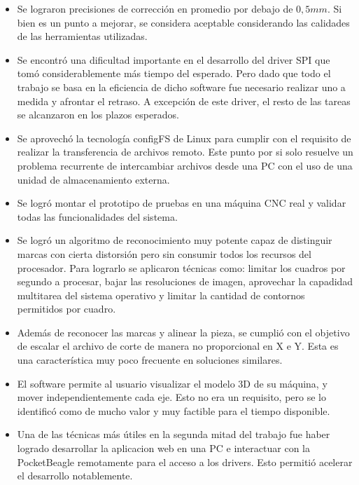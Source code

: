 \begin{itemize}
   \item{Se lograron precisiones de corrección en promedio por debajo de $0,5mm$. Si bien es un punto a mejorar, se considera aceptable considerando las calidades de las herramientas utilizadas.}

   \item{Se encontró una dificultad importante en el desarrollo del driver SPI que tomó considerablemente más tiempo del esperado. Pero dado que todo el trabajo se basa en la eficiencia de dicho software fue necesario realizar uno a medida y afrontar el retraso. A excepción de este driver, el resto de las tareas se alcanzaron en los plazos esperados.}
   
   \item{Se aprovechó la tecnología configFS de Linux para cumplir con el requisito de realizar la transferencia de archivos remoto. Este punto por si solo resuelve un problema recurrente de intercambiar archivos desde una PC con el uso de una unidad de almacenamiento externa.}

   \item{Se logró montar el prototipo de pruebas en una máquina CNC real y validar todas las funcionalidades del sistema.}

   \item{Se logró un algoritmo de reconocimiento muy potente capaz de distinguir marcas con cierta distorsión pero sin consumir todos los recursos del procesador.  Para lograrlo se aplicaron técnicas como: limitar los cuadros por segundo a procesar, bajar las resoluciones de imagen, aprovechar la capadidad multitarea del sistema operativo y limitar la cantidad de contornos permitidos por cuadro.}

   \item{Además de reconocer las marcas y alinear la pieza, se cumplió con el objetivo de escalar el archivo de corte de manera no proporcional en X e Y. Esta es una característica muy poco frecuente en soluciones similares.}

   \item{El software permite al usuario visualizar el modelo 3D de su máquina, y mover independientemente cada eje. Esto no era un requisito, pero se lo identificó como de mucho valor y muy factible para el tiempo disponible.}

   \item{Una de las técnicas más útiles en la segunda mitad del trabajo fue haber logrado desarrollar la aplicacion web en una PC e interactuar con la PocketBeagle remotamente para el acceso a los drivers. Esto permitió acelerar el desarrollo notablemente.}

\end{itemize}

